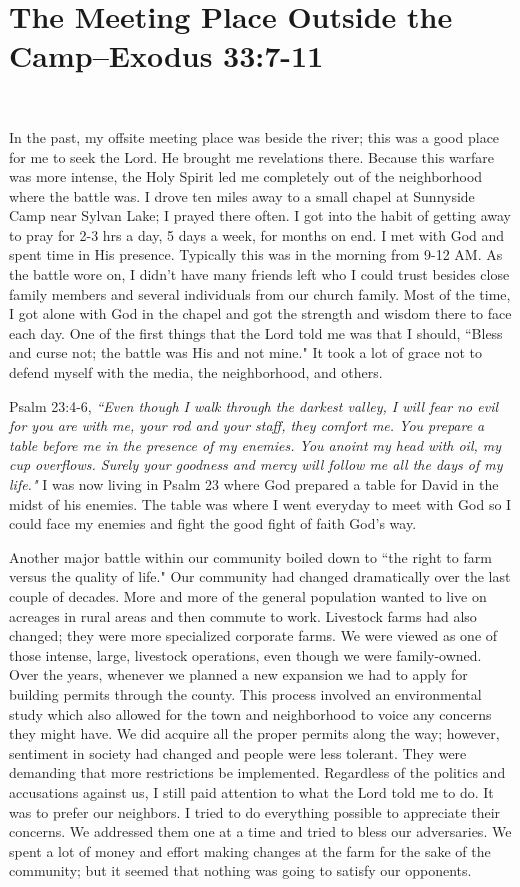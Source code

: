 \documentclass[oneside,12pt]{book}
\begin{document}
\section{The Meeting Place Outside the Camp--Exodus 33:7-11}
\

In the past, my offsite meeting place was beside the river; this was a good place for me to seek the Lord. He brought me revelations there. Because this warfare was more intense, the Holy Spirit led me completely out of the neighborhood where the battle was. I drove ten miles away to a small chapel at Sunnyside Camp near Sylvan Lake; I prayed there often. I got into the habit of getting away to pray for 2-3 hrs a day, 5 days a week, for months on end. I met with God and spent time in His presence. Typically this was in the morning from 9-12 AM. As the battle wore on, I didn't have many friends left who I could trust besides close family members and several individuals from our church family. Most of the time, I got alone with God in the chapel and got the strength and wisdom there to face each day. One of the first things that the Lord told me was that I should, ``Bless and curse not; the battle was His and not mine." It took a lot of grace not to defend myself with the media, the neighborhood, and others.


Psalm 23:4-6, \textit{``Even though I walk through the darkest valley, I will fear no evil for you are with me, your rod and your staff, they comfort me. You prepare a table before me in the presence of my enemies. You anoint my head with oil, my cup overflows. Surely your goodness and mercy will follow me all the days of my life."} I was now living in Psalm 23 where God prepared a table for David in the midst of his enemies. The table was where I went everyday to meet with God so I could face my enemies and fight the good fight of faith God's way.

Another major battle within our community boiled down to ``the right to farm versus the quality of life." Our community had changed dramatically over the last couple of decades. More and more of the general population wanted to live on acreages in rural areas and then commute to work. Livestock farms had also changed; they were more specialized corporate farms. We were viewed as one of those intense, large, livestock operations, even though we were family-owned. Over the years, whenever we planned a new expansion we had to apply for building permits through the county. This process involved an environmental study which also allowed for the town and neighborhood to voice any concerns they might have. We did acquire all the proper permits along the way; however, sentiment in society had changed and people were less tolerant. They were demanding that more restrictions be implemented. Regardless of the politics and accusations against us, I still paid attention to what the Lord told me to do. It was to prefer our neighbors. I tried to do everything possible to appreciate their concerns. We addressed them one at a time and tried to bless our adversaries. We spent a lot of money and effort making changes at the farm for the sake of the community; but it seemed that nothing was going to satisfy our opponents. 
\end{document}
